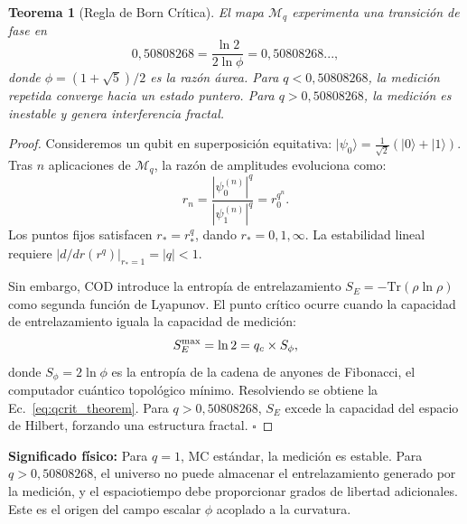 \documentclass[12pt, a4paper]{article}
\theoremstyle{miuThm}
\newtheorem{theorem}{Teorema}[section]
\theoremstyle{remark}
\newcommand{\qcrit}{0{,}50808268}
\begin{document}
\begin{theorem}[Regla de Born Crítica]
\label{thm:qcrit}
El mapa $\mathcal{M}_q$ experimenta una transición de fase en
\begin{equation}
\qcrit = \frac{\ln 2}{2\ln\phi} = 0{,}50808268...,
\label{eq:qcrit_theorem}
\end{equation}
donde $\phi = (1+\sqrt{5})/2$ es la razón áurea. Para $q < \qcrit$, la medición
repetida converge hacia un estado puntero. Para $q > \qcrit$, la medición es
inestable y genera interferencia fractal.
\end{theorem}

\begin{proof}
Consideremos un qubit en superposición equitativa: $|\psi_0\rangle = \frac{1}{\sqrt{2}}(|0\rangle + |1\rangle)$.
Tras $n$ aplicaciones de $\mathcal{M}_q$, la razón de amplitudes evoluciona como:
\begin{equation}
r_n = \frac{|\psi_0^{(n)}|^q}{|\psi_1^{(n)}|^q} = r_0^{q^n}.
\end{equation}
Los puntos fijos satisfacen $r_* = r_*^{q}$, dando $r_* = 0, 1, \infty$.
La estabilidad lineal requiere $|d/dr (r^q)|_{r_*=1} = |q| < 1$.

Sin embargo, COD introduce la entropía de entrelazamiento $S_E = -\text{Tr}(\rho\ln\rho)$
como segunda función de Lyapunov. El punto crítico ocurre cuando la capacidad de
entrelazamiento iguala la capacidad de medición:
\begin{equation}
S_E^{\rm max} = \ln 2 = q_c \times S_{\phi},
\end{equation}
donde $S_{\phi} = 2\ln\phi$ es la entropía de la cadena de anyones de Fibonacci,
el computador cuántico topológico mínimo. Resolviendo se obtiene la
Ec.~\eqref{eq:qcrit_theorem}. Para $q > \qcrit$, $S_E$ excede la capacidad del
espacio de Hilbert, forzando una estructura fractal. $\square$
\end{proof}

\textbf{Significado físico:} Para $q = 1$, MC estándar, la medición es estable.
Para $q > \qcrit$, el universo no puede almacenar el entrelazamiento generado por
la medición, y el espaciotiempo debe proporcionar grados de libertad adicionales.
Este es el origen del campo escalar $\phi$ acoplado a la curvatura.

\end{document}
